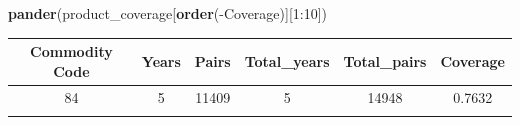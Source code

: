 \documentclass[10pt,]{article}
\newenvironment{Shaded}{\begin{snugshade}}{\end{snugshade}}
\newcommand{\KeywordTok}[1]{\textcolor[rgb]{0.13,0.29,0.53}{\textbf{{#1}}}}
\newcommand{\DecValTok}[1]{\textcolor[rgb]{0.00,0.00,0.81}{{#1}}}
\newcommand{\NormalTok}[1]{{#1}}
\begin{document}
\begin{Shaded}
\begin{Highlighting}[]
\KeywordTok{pander}\NormalTok{(product_coverage[}\KeywordTok{order}\NormalTok{(-Coverage)][}\DecValTok{1}\NormalTok{:}\DecValTok{10}\NormalTok{])}
\end{Highlighting}
\end{Shaded}

\begin{longtable}[]{@{}cccccc@{}}
\toprule
\begin{minipage}[b]{0.20\columnwidth}\centering\strut
Commodity Code\strut
\end{minipage} & \begin{minipage}[b]{0.09\columnwidth}\centering\strut
Years\strut
\end{minipage} & \begin{minipage}[b]{0.09\columnwidth}\centering\strut
Pairs\strut
\end{minipage} & \begin{minipage}[b]{0.16\columnwidth}\centering\strut
Total\_years\strut
\end{minipage} & \begin{minipage}[b]{0.16\columnwidth}\centering\strut
Total\_pairs\strut
\end{minipage} & \begin{minipage}[b]{0.12\columnwidth}\centering\strut
Coverage\strut
\end{minipage}\tabularnewline
\midrule
\endhead
\begin{minipage}[t]{0.20\columnwidth}\centering\strut
84\strut
\end{minipage} & \begin{minipage}[t]{0.09\columnwidth}\centering\strut
5\strut
\end{minipage} & \begin{minipage}[t]{0.09\columnwidth}\centering\strut
11409\strut
\end{minipage} & \begin{minipage}[t]{0.16\columnwidth}\centering\strut
5\strut
\end{minipage} & \begin{minipage}[t]{0.16\columnwidth}\centering\strut
14948\strut
\end{minipage} & \begin{minipage}[t]{0.12\columnwidth}\centering\strut
0.7632\strut
\end{minipage}\tabularnewline
\begin{minipage}[t]{0.20\columnwidth}\centering\strut

\end{minipage}
\end{longtable}
\end{document}
